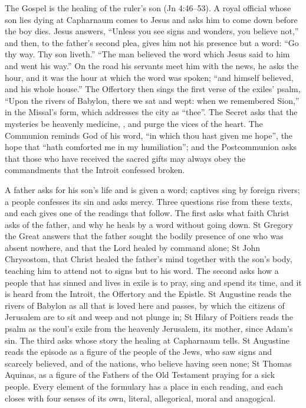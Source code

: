The Gospel is the healing of the ruler's son (Jn 4:46--53). A royal official
whose son lies dying at Capharnaum comes to Jesus and asks him to come down
before the boy dies. Jesus answers, ``Unless you see signs and wonders, you
believe not,'' and then, to the father's second plea, gives him not his
presence but a word: ``Go thy way. Thy son liveth.'' ``The man believed the word
which Jesus said to him and went his way.'' On the road his servants meet him
with the news, he asks the hour, and it was the hour at which the word was
spoken; ``and himself believed, and his whole house.'' The Offertory then sings
the first verse of the exiles' psalm, ``Upon the rivers of Babylon, there we sat
and wept: when we remembered Sion,'' in the Missal's form, which addresses the
city as ``thee''. The Secret asks that the mysteries be heavenly medicine,
, and purge the vices of the heart. The Communion
reminds God of his word, ``in which thou hast given me hope'', the hope that
``hath comforted me in my humiliation''; and the Postcommunion asks that those
who have received the sacred gifts may always obey the commandments that the
Introit confessed broken.

A father asks for his son's life and is given a word; captives sing by foreign
rivers; a people confesses its sin and asks mercy. Three questions rise from
these texts, and each gives one of the readings that follow. The first asks
what faith Christ asks of the father, and why he heals by a word without going
down. St Gregory the Great answers that the father sought the bodily presence
of one who was absent nowhere, and that the Lord healed by command alone; St
John Chrysostom, that Christ healed the father's mind together with the son's
body, teaching him to attend not to signs but to his word. The second asks how
a people that has sinned and lives in exile is to pray, sing and spend its
time, and it is heard from the Introit, the Offertory and the Epistle. St
Augustine reads the rivers of Babylon as all that is loved here and passes, by
which the citizens of Jerusalem are to sit and weep and not plunge in; St
Hilary of Poitiers reads the psalm as the soul's exile from the heavenly
Jerusalem, its mother, since Adam's sin. The third asks whose story the healing
at Capharnaum tells. St Augustine reads the episode as a figure of the people
of the Jews, who saw signs and scarcely believed, and of the nations, who
believe having seen none; St Thomas Aquinas, as a figure of the Fathers of the
Old Testament praying for a sick people. Every element of the formulary has a
place in each reading, and each closes with four senses of its own, literal,
allegorical, moral and anagogical.


